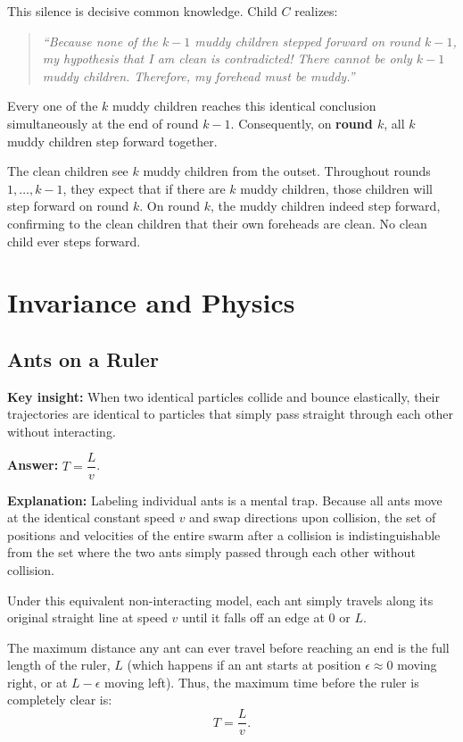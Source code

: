 \documentclass[12pt]{article}
\newcommand{\insight}[1]{\par\medskip\noindent\textbf{Key insight:} #1}
\begin{document}
This silence is decisive common knowledge. Child $C$ realizes:
\begin{quote}
\textit{``Because none of the $k - 1$ muddy children stepped forward on round $k - 1$, my hypothesis that I am clean is contradicted! There cannot be only $k - 1$ muddy children. Therefore, my forehead must be muddy.''}
\end{quote}
Every one of the $k$ muddy children reaches this identical conclusion simultaneously at the end of round $k - 1$. Consequently, on \textbf{round $k$}, all $k$ muddy children step forward together.

The clean children see $k$ muddy children from the outset. Throughout rounds $1, \dots, k-1$, they expect that if there are $k$ muddy children, those children will step forward on round $k$. On round $k$, the muddy children indeed step forward, confirming to the clean children that their own foreheads are clean. No clean child ever steps forward.

\section{Invariance and Physics}

\subsection{Ants on a Ruler}

\insight{When two identical particles collide and bounce elastically, their trajectories are identical to particles that simply pass straight through each other without interacting.}

\textbf{Answer:} $T = \dfrac{L}{v}$.

\textbf{Explanation:}
Labeling individual ants is a mental trap. Because all ants move at the identical constant speed $v$ and swap directions upon collision, the set of positions and velocities of the entire swarm after a collision is indistinguishable from the set where the two ants simply passed through each other without collision.

Under this equivalent non-interacting model, each ant simply travels along its original straight line at speed $v$ until it falls off an edge at $0$ or $L$.

The maximum distance any ant can ever travel before reaching an end is the full length of the ruler, $L$ (which happens if an ant starts at position $\epsilon \approx 0$ moving right, or at $L - \epsilon$ moving left). Thus, the maximum time before the ruler is completely clear is:
\[
T = \frac{L}{v}.
\]
\end{document}
